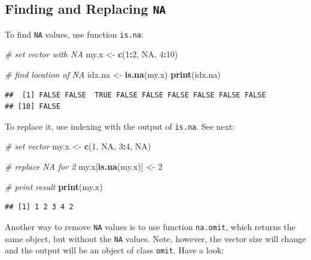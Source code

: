\documentclass[11pt,]{book}
\newenvironment{Shaded}{\begin{snugshade}}{\end{snugshade}}
\newcommand{\KeywordTok}[1]{\textcolor[rgb]{0.27,0.27,0.27}{\textbf{#1}}}
\newcommand{\DecValTok}[1]{\textcolor[rgb]{0.06,0.06,0.06}{#1}}
\newcommand{\StringTok}[1]{\textcolor[rgb]{0.5,0.5,0.5}{#1}}
\newcommand{\CommentTok}[1]{\textcolor[rgb]{0.56,0.35,0.01}{\textit{#1}}}
\newcommand{\OtherTok}[1]{\textcolor[rgb]{0.56,0.35,0.01}{#1}}
\newcommand{\OperatorTok}[1]{\textcolor[rgb]{0.81,0.36,0.00}{\textbf{#1}}}
\newcommand{\NormalTok}[1]{#1}
\begin{document}
\subsection{\texorpdfstring{Finding and Replacing
\texttt{NA}}{Finding and Replacing NA}}\label{finding-and-replacing-na}

To find \texttt{NA} values, use function \texttt{is.na}:

\begin{Shaded}
\begin{Highlighting}[]
\CommentTok{# set vector with NA}
\NormalTok{my.x <-}\StringTok{ }\KeywordTok{c}\NormalTok{(}\DecValTok{1}\OperatorTok{:}\DecValTok{2}\NormalTok{, }\OtherTok{NA}\NormalTok{, }\DecValTok{4}\OperatorTok{:}\DecValTok{10}\NormalTok{)}

\CommentTok{# find location of NA}
\NormalTok{idx.na <-}\StringTok{ }\KeywordTok{is.na}\NormalTok{(my.x)}
\KeywordTok{print}\NormalTok{(idx.na)}
\end{Highlighting}
\end{Shaded}

\begin{verbatim}
##  [1] FALSE FALSE  TRUE FALSE FALSE FALSE FALSE FALSE FALSE
## [10] FALSE
\end{verbatim}

To replace it, use indexing with the output of \texttt{is.na}. See next:

\begin{Shaded}
\begin{Highlighting}[]
\CommentTok{# set vector}
\NormalTok{my.x <-}\StringTok{ }\KeywordTok{c}\NormalTok{(}\DecValTok{1}\NormalTok{, }\OtherTok{NA}\NormalTok{, }\DecValTok{3}\OperatorTok{:}\DecValTok{4}\NormalTok{, }\OtherTok{NA}\NormalTok{)}

\CommentTok{# replace NA for 2}
\NormalTok{my.x[}\KeywordTok{is.na}\NormalTok{(my.x)] <-}\StringTok{ }\DecValTok{2}

\CommentTok{# print result}
\KeywordTok{print}\NormalTok{(my.x)}
\end{Highlighting}
\end{Shaded}

\begin{verbatim}
## [1] 1 2 3 4 2
\end{verbatim}

Another way to remove \texttt{NA} values is to use function
\texttt{na.omit}, which returns the same object, but without the
\texttt{NA} values. Note, however, the vector size will change and the
output will be an object of class \texttt{omit}. Have a look:
 
\end{document}
